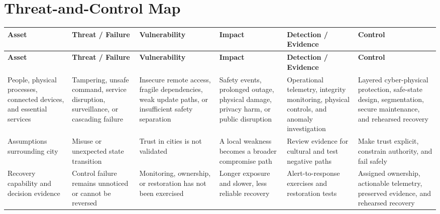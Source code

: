 \documentclass[11pt]{article}
\begin{document}
\section*{Threat-and-Control Map}
\begingroup\scriptsize\setlength{\tabcolsep}{2pt}
\begin{longtable}{>{\RaggedRight\arraybackslash}p{}>{\RaggedRight\arraybackslash}p{}>{\RaggedRight\arraybackslash}p{}>{\RaggedRight\arraybackslash}p{}>{\RaggedRight\arraybackslash}p{}>{\RaggedRight\arraybackslash}p{}}
\toprule\rowcolor{Navy}\color{white}\textbf{Asset} & \color{white}\textbf{Threat / Failure} & \color{white}\textbf{Vulnerability} & \color{white}\textbf{Impact} & \color{white}\textbf{Detection / Evidence} & \color{white}\textbf{Control}\\\midrule
\endfirsthead
\toprule\rowcolor{Navy}\color{white}\textbf{Asset} & \color{white}\textbf{Threat / Failure} & \color{white}\textbf{Vulnerability} & \color{white}\textbf{Impact} & \color{white}\textbf{Detection / Evidence} & \color{white}\textbf{Control}\\\midrule
\endhead
People, physical processes, connected devices, and essential services & Tampering, unsafe command, service disruption, surveillance, or cascading failure & Insecure remote access, fragile dependencies, weak update paths, or insufficient safety separation & Safety events, prolonged outage, physical damage, privacy harm, or public disruption & Operational telemetry, integrity monitoring, physical controls, and anomaly investigation & Layered cyber-physical protection, safe-state design, segmentation, secure maintenance, and rehearsed recovery\\\midrule
Assumptions surrounding city & Misuse or unexpected state transition & Trust in cities is not validated & A local weakness becomes a broader compromise path & Review evidence for cultural and test negative paths & Make trust explicit, constrain authority, and fail safely\\\midrule
Recovery capability and decision evidence & Control failure remains unnoticed or cannot be reversed & Monitoring, ownership, or restoration has not been exercised & Longer exposure and slower, less reliable recovery & Alert-to-response exercises and restoration tests & Assigned ownership, actionable telemetry, preserved evidence, and rehearsed recovery\\\midrule
\bottomrule
\end{longtable}
\endgroup
\end{document}
